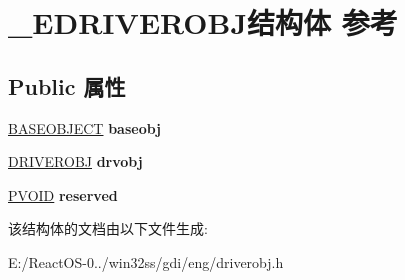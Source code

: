 \hypertarget{struct___e_d_r_i_v_e_r_o_b_j}{}\section{\+\_\+\+E\+D\+R\+I\+V\+E\+R\+O\+B\+J结构体 参考}
\label{struct___e_d_r_i_v_e_r_o_b_j}
\subsection*{Public 属性}
\begin{DoxyCompactItemize}
\item 
\mbox{\label{struct___e_d_r_i_v_e_r_o_b_j_aca691879d49eddcebf1286ad4b3f0f34}} 
\hyperlink{class_b_a_s_e_o_b_j_e_c_t}{B\+A\+S\+E\+O\+B\+J\+E\+CT} {\bfseries baseobj}
\item 
\mbox{\label{struct___e_d_r_i_v_e_r_o_b_j_a902c254ae80df4609d7fc4ac31582278}} 
\hyperlink{struct___d_r_i_v_e_r_o_b_j}{D\+R\+I\+V\+E\+R\+O\+BJ} {\bfseries drvobj}
\item 
\mbox{\label{struct___e_d_r_i_v_e_r_o_b_j_af66eb94dfb4652589bbada8ed8860c69}} 
\hyperlink{interfacevoid}{P\+V\+O\+ID} {\bfseries reserved}
\end{DoxyCompactItemize}


该结构体的文档由以下文件生成\+:\begin{DoxyCompactItemize}
\item 
E\+:/\+React\+O\+S-\/0../win32ss/gdi/eng/driverobj.\+h\end{DoxyCompactItemize}

